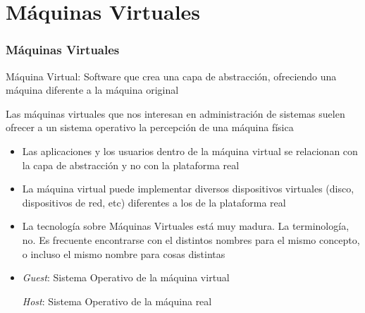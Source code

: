 \documentclass[ucs]{beamer}
\begin{document}
\section{Máquinas Virtuales}
\begin{frame}[fragile]
\frametitle{Máquinas Virtuales}

Máquina Virtual: Software que crea una capa de abstracción, 
ofreciendo una máquina diferente a la máquina original

Las máquinas virtuales que nos interesan en administración de 
sistemas suelen ofrecer a un sistema operativo la percepción
de una máquina física


\begin{itemize}	
\item
Las aplicaciones y los usuarios dentro de la máquina virtual se relacionan
con la capa de abstracción y no con la plataforma real

\item 
La máquina virtual puede implementar diversos dispositivos virtuales (disco, dispositivos
de red, etc) diferentes a los de la plataforma real

\end{itemize}


\end{frame}



\begin{frame}[fragile]
\begin{itemize}
\item
La tecnología sobre Máquinas Virtuales está muy madura. La terminología, no. 
Es frecuente encontrarse 
con el distintos nombres para el mismo concepto, o incluso el mismo nombre para cosas distintas
\item
\emph{Guest}: Sistema Operativo de la máquina virtual

\emph{Host}: Sistema Operativo de la máquina real
\end{itemize}

\end{frame}
\end{document}
